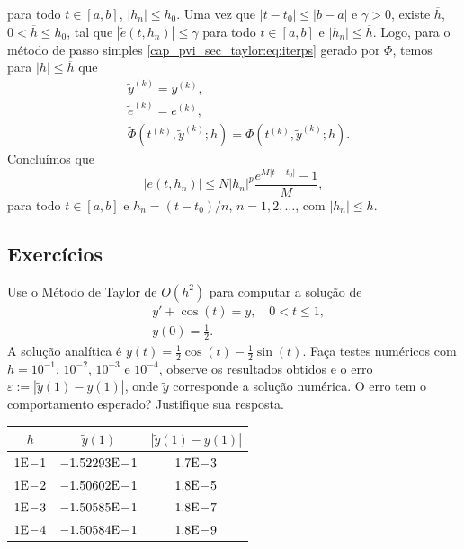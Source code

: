 \begin{dem}
\begin{equation}
  \end{equation}
  para todo $t\in [a, b]$, $|h_n|\leq h_0$. Uma vez que $|t-t_0|\leq |b-a|$ e $\gamma >0$, existe $\overline{h}$, $0<\overline{h}\leq h_0$, tal que $\left|\tilde{e}\left(t, h_n\right)\right| \leq \gamma$ para todo $t\in [a, b]$ e $|h_n|\leq \overline{h}$. Logo, para o método de passo simples \eqref{cap_pvi_sec_taylor:eq:iterps} gerado por $\Phi$, temos para $|h|\leq\overline{h}$ que
  \begin{align}
    &\tilde{y}^{(k)} = y^{(k)},\\
    &\tilde{e}^{(k)} = e^{(k)},\\
    &\tilde{\Phi}\left(t^{(k)}, \tilde{y}^{(k)}; h\right) = \Phi\left(t^{(k)}, \tilde{y}^{(k)}; h\right).
  \end{align}
  Concluímos que
  \begin{equation}
    \left|e\left(t, h_n\right)\right| \leq N|h_n|^p\frac{e^{M|t-t_0|}-1}{M},
  \end{equation}
  para todo $t\in [a, b]$ e $h_n = (t-t_0)/n$, $n=1, 2, \ldots$, com $|h_n|\leq \overline{h}$.
\end{dem}

\subsection{Exercícios}

\begin{exer}
  Use o Método de Taylor de $O(h^2)$ para computar a solução de
  \begin{subequations}\label{cap_pvi_sec_taylor:eq:pvi_exer_0}
    \begin{align}
      &y' + \cos(t) = y,\quad 0 < t \leq 1,\\
      &y(0) = \frac{1}{2}.
    \end{align}
  \end{subequations}
  A solução analítica é $y(t) = \frac{1}{2}\cos(t) - \frac{1}{2}\sin(t)$. Faça testes numéricos com $h=10^{-1}$, $10^{-2}$, $10^{-3}$ e $10^{-4}$, observe os resultados obtidos e o erro $\varepsilon := |\tilde{y}(1) - y(1)|$, onde $\tilde{y}$ corresponde a solução numérica. O erro tem o comportamento esperado? Justifique sua resposta.
\end{exer}
\begin{resp}
  \begin{tabular}{c|c|c}
    $h$ & $\tilde{y}(1)$ & $\left|\tilde{y}(1)-y(1)\right|$\\\hline
    $1\mathrm{E}\!-\!1$ & $-1.52293\mathrm{E}\!-\!1$ & $1.7\mathrm{E}\!-\!3$ \\
    $1\mathrm{E}\!-\!2$ & $-1.50602\mathrm{E}\!-\!1$ & $1.8\mathrm{E}\!-\!5$ \\
    $1\mathrm{E}\!-\!3$ & $-1.50585\mathrm{E}\!-\!1$ & $1.8\mathrm{E}\!-\!7$ \\
    $1\mathrm{E}\!-\!4$ & $-1.50584\mathrm{E}\!-\!1$ & $1.8\mathrm{E}\!-\!9$ \\\hline
  \end{tabular}
\end{resp}

